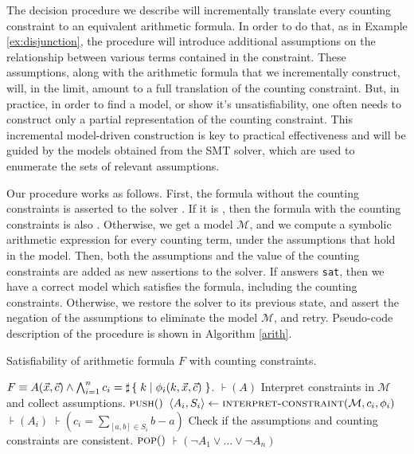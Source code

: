 The decision procedure we describe will incrementally translate every
counting constraint to an equivalent arithmetic formula. In order to
do that, as in Example \ref{ex:disjunction}, the procedure will
introduce additional assumptions on the relationship between various
terms contained in the constraint. These assumptions, along with the
arithmetic formula that we incrementally construct, will, in the
limit, amount to a full translation of the counting constraint. But,
in practice, in order to find a model, or show it's unsatisfiability,
one often needs to construct only a partial representation of the
counting constraint. This incremental model-driven construction is key
to practical effectiveness and will be guided by the models obtained
from the SMT solver, which are used to enumerate the sets of relevant
assumptions.

Our procedure works as follows. First, the formula without the
counting constraints is asserted to the solver \solver. If it is
\unsat, then the formula with the counting constraints is also
\sat. Otherwise, we get a model $\mathcal{M}$, and we
compute a symbolic arithmetic expression for every counting term,
under the assumptions that hold in the model. Then, both the
assumptions and the value of the counting constraints are added as new
assertions to the solver. If \solver answers \texttt{sat}, then we
have a correct model which satisfies the formula, including the
counting constraints. Otherwise, we restore the solver to its previous
state, and assert the negation of the assumptions to eliminate the
model $\mathcal{M}$, and retry. Pseudo-code description of the
procedure is shown in Algorithm \ref{arith}.

\begin{algorithm}[h]
\caption{Satisfiability of arithmetic formula $F$ with counting constraints.}\label{arith}
\begin{algorithmic}[1]
\Require $F \equiv A(\vec{x}, \vec{c}) \land \bigwedge_{i=1}^n c_i = \sharp\left\lbrace\;k\;|\;\phi_i(k, \vec{x}, \vec{c})\;\right\rbrace$.
\State $\assert(A)$
    \LineComment Interpret constraints in $\mathcal{M}$ and collect assumptions.
    \State $\textsc{push}()$
        \State $\langle A_i, S_i \rangle \gets \textsc{interpret-constraint}(\mathcal{M}, c_i, \phi_i)$
        \State $\assert(A_i)$
        \State $\assert(c_i = \sum_{[a, b] \in S_i} b - a)$
    \EndFor
    \LineComment Check if the assumptions and counting constraints are consistent.
        \State {}
    \EndIf
    \State $\textsc{pop}()$
    \State $\assert(\lnot A_1 \vee \ldots \vee \lnot A_n)$
\EndWhile
\State \Return{\unsat}
\EndProcedure
\end{algorithmic}
\label{arith}
\end{algorithm}

